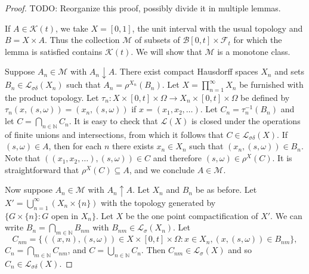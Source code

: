 \begin{proof}

  TODO: Reorganize this proof, possibly divide it in multiple lemmas.

  If $A \in \mathcal{K}(t)$, we take $X = [0,1]$, the unit interval with the
  usual topology and $B = X \times A$. Thus the collection $\mathcal{M}$ of
  subsets of $\mathcal{B}[0,t] \times \mathcal{F}_t$
  for which the lemma is satisfied contains $\mathcal{K}(t)$. We will
  show that $\mathcal{M}$ is a monotone class.


  Suppose $A_n \in \mathcal{M}$ with $A_n \downarrow A$. There exist compact Hausdorff
  spaces $X_n$ and sets $B_n \in \mathcal{L}_{\sigma\delta}(X_n)$ such that $A_n = \rho^{X_n}(B_n)$.
  Let $X = \prod_{n=1}^\infty X_n$ be furnished with the product topology. Let
  $\tau_n: X \times [0,t] \times \Omega \to X_n \times [0,t] \times \Omega$ be defined by $\tau_n(x,(s,\omega))
  = (x_n,(s,\omega))$ if $x = (x_1,x_2, \ldots)$. Let $C_n = \tau_n^{-1}(B_n)$
  and let $C = \bigcap_{n \in \mathbb{N}} C_n$. It is easy to check that $\mathcal{L}(X)$ is closed under
  the operations of finite unions and intersections, from which it follows
  that $C \in \mathcal{L}_{\sigma\delta}(X)$. If $(s,\omega) \in A$, then for each $n$ there exists $x_n \in X_n$ such that $(x_n,(s,\omega)) \in B_n$. Note that
  $((x_1,x_2, \ldots),(s,\omega)) \in C$ and therefore $(s,\omega) \in \rho^X(C)$.
  It is straightforward that $\rho^X(C) \subseteq A$, and we conclude
  $A \in \mathcal{M}$.

  Now suppose $A_n \in \mathcal{M}$ with $A_n \uparrow A$. Let $X_n$ and $B_n$ be as before.
  Let $X' = \bigcup_{n=1}^\infty (X_n \times \{n\})$ with the topology generated by
  $\{G \times \{n\}: G \text{ open in } X_n\}$. Let $X$ be the one point
  compactification of $X'$. We can write $B_n = \bigcap_{m \in \mathbb{N}} B_{nm}$ with
  $B_{nm} \in \mathcal{L}_\sigma(X_n)$. Let
  $$C_{nm} = \{((x,n),(s,\omega)) \in X \times [0,t] \times \Omega: x \in X_n, (x,(s,\omega)) \in B_{nm}\},$$
  $C_n = \bigcap_{m \in \mathbb{N}} C_{nm}$, and $C = \bigcup_{n \in \mathbb{N}} C_n$.
  Then $C_{nm} \in \mathcal{L}_\sigma(X)$ and so $C_n \in \mathcal{L}_{\sigma\delta}(X)$.


\end{proof}
